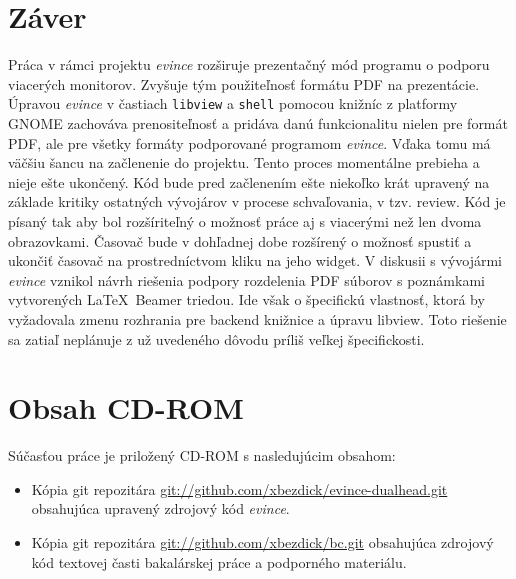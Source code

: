 \documentclass[12pt,oneside,final]{fithesis2}
\begin{document}
\chapter{Záver}
Práca v rámci projektu \emph{evince} rozširuje prezentačný mód programu o podporu viacerých monitorov. Zvyšuje tým použiteľnosť formátu PDF na prezentácie. Úpravou \emph{evince} v častiach \texttt{libview} a \texttt{shell} pomocou knižníc z platformy GNOME zachováva prenositeľnosť a pridáva danú funkcionalitu nielen pre formát PDF, ale pre všetky formáty podporované programom \emph{evince}. Vďaka tomu má väčšiu šancu na začlenenie do projektu. Tento proces momentálne prebieha a nieje ešte ukončený. Kód bude pred začlenením ešte niekoľko krát upravený na základe kritiky ostatných vývojárov v procese schvaľovania, v tzv. review. Kód je písaný tak aby bol rozšíriteľný o možnosť práce aj s viacerými než len dvoma obrazovkami. Časovač bude v dohľadnej dobe rozšírený o možnosť spustiť a ukončiť časovač na prostredníctvom kliku na jeho widget. V diskusii s vývojármi \emph{evince} vznikol návrh riešenia podpory rozdelenia PDF súborov s poznámkami vytvorených \LaTeX~Beamer triedou. Ide však o špecifickú vlastnosť, ktorá by vyžadovala zmenu rozhrania pre backend knižnice a úpravu libview. Toto riešenie sa zatiaľ neplánuje z už uvedeného dôvodu príliš veľkej špecifickosti.

\appendix
\chapter{Obsah CD-ROM}
Súčasťou práce je priložený CD-ROM s nasledujúcim obsahom:
\begin{itemize}
\item Kópia git repozitára \url{git://github.com/xbezdick/evince-dualhead.git} obsahujúca upravený zdrojový kód \emph{evince}.
\item Kópia git repozitára \url{git://github.com/xbezdick/bc.git} obsahujúca zdrojový kód textovej časti bakalárskej práce a podporného materiálu.
\end{itemize}
\raggedright


\end{document}
